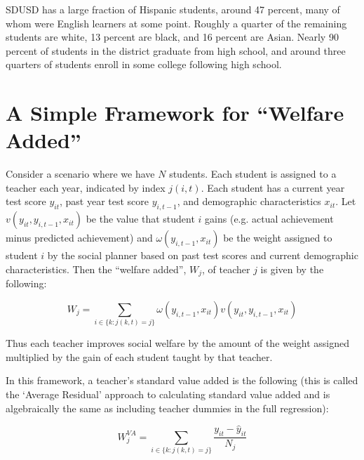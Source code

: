 \documentclass[letterpaper,12pt]{article}
\begin{document}
\noindent SDUSD has a large fraction of Hispanic students, around 47 percent, many of whom were English learners at some point. Roughly a quarter of the remaining students are white, 13 percent are black, and 16 percent are Asian. Nearly 90 percent of students in the district graduate from high school, and around three quarters of students enroll in some college following high school.




\section{A Simple Framework for ``Welfare Added''}\label{sec: Welfare}

Consider a scenario where we have $N$ students. Each student is assigned to a teacher each year, indicated by index $j(i,t)$. Each student has a current year test score $y_{it}$, past year test score $y_{i,t-1}$, and demographic characteristics $x_{it}$. Let $v(y_{it}, y_{i,t-1}, x_{it})$ be the value that student $i$ gains (e.g. actual achievement minus predicted achievement) and $\omega(y_{i,t-1}, x_{it})$ be the weight assigned to student $i$ by the social planner based on past test scores and current demographic characteristics. Then the ``welfare added'', $W_j$, of teacher $j$ is given by the following:

    \begin{equation}\label{eq: welfare}
        W_j = \sum_{i \in \{k : j(k, t) = j\} } \omega(y_{i,t-1}, x_{it})v(y_{it}, y_{i,t-1}, x_{it})
    \end{equation}
    
\noindent Thus each teacher improves social welfare by the amount of the weight assigned multiplied by the gain of each student taught by that teacher.

In this framework, a teacher's standard value added is the following (this is called the `Average Residual' approach to calculating standard value added and is algebraically the same as including teacher dummies in the full regression):
    
    \begin{equation*}
        W_j^{VA} = \sum_{i \in \{k : j(k, t) = j\} } \frac{y_{it} - \hat{y}_{it}}{N_j}
    \end{equation*}
\end{document}
